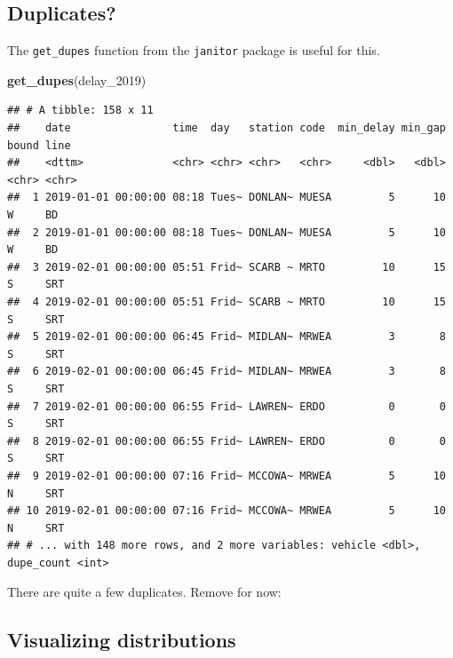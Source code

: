 \documentclass[
]{book}
\newenvironment{Shaded}{\begin{snugshade}}{\end{snugshade}}
\newcommand{\DecValTok}[1]{\textcolor[rgb]{0.00,0.00,0.81}{#1}}
\newcommand{\KeywordTok}[1]{\textcolor[rgb]{0.13,0.29,0.53}{\textbf{#1}}}
\newcommand{\NormalTok}[1]{#1}
\newcommand{\OperatorTok}[1]{\textcolor[rgb]{0.81,0.36,0.00}{\textbf{#1}}}
\newcommand{\StringTok}[1]{\textcolor[rgb]{0.31,0.60,0.02}{#1}}
\begin{document}
\hypertarget{duplicates}{%
\subsection{Duplicates?}\label{duplicates}}

The \texttt{get\_dupes} function from the \texttt{janitor} package is useful for this.

\begin{Shaded}
\begin{Highlighting}[]
\KeywordTok{get_dupes}\NormalTok{(delay_}\DecValTok{2019}\NormalTok{)}
\end{Highlighting}
\end{Shaded}

\begin{verbatim}
## # A tibble: 158 x 11
##    date                time  day   station code  min_delay min_gap bound line 
##    <dttm>              <chr> <chr> <chr>   <chr>     <dbl>   <dbl> <chr> <chr>
##  1 2019-01-01 00:00:00 08:18 Tues~ DONLAN~ MUESA         5      10 W     BD   
##  2 2019-01-01 00:00:00 08:18 Tues~ DONLAN~ MUESA         5      10 W     BD   
##  3 2019-02-01 00:00:00 05:51 Frid~ SCARB ~ MRTO         10      15 S     SRT  
##  4 2019-02-01 00:00:00 05:51 Frid~ SCARB ~ MRTO         10      15 S     SRT  
##  5 2019-02-01 00:00:00 06:45 Frid~ MIDLAN~ MRWEA         3       8 S     SRT  
##  6 2019-02-01 00:00:00 06:45 Frid~ MIDLAN~ MRWEA         3       8 S     SRT  
##  7 2019-02-01 00:00:00 06:55 Frid~ LAWREN~ ERDO          0       0 S     SRT  
##  8 2019-02-01 00:00:00 06:55 Frid~ LAWREN~ ERDO          0       0 S     SRT  
##  9 2019-02-01 00:00:00 07:16 Frid~ MCCOWA~ MRWEA         5      10 N     SRT  
## 10 2019-02-01 00:00:00 07:16 Frid~ MCCOWA~ MRWEA         5      10 N     SRT  
## # ... with 148 more rows, and 2 more variables: vehicle <dbl>, dupe_count <int>
\end{verbatim}

There are quite a few duplicates. Remove for now:

\begin{Shaded}
\end{Shaded}

\hypertarget{visualizing-distributions}{%
\subsection{Visualizing distributions}\label{visualizing-distributions}}
\end{document}
